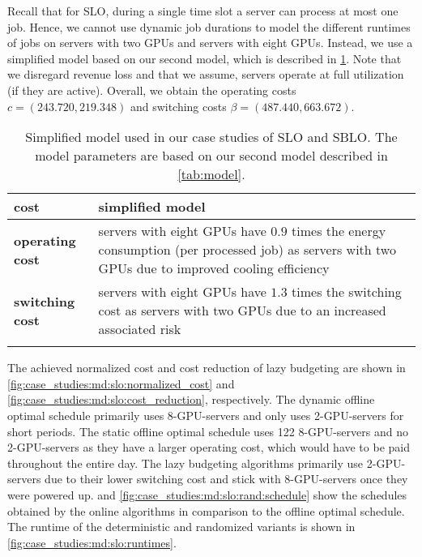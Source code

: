 Recall that for SLO, during a single time slot a server can process at most one job. Hence, we cannot use dynamic job durations to model the different runtimes of jobs on servers with two GPUs and servers with eight GPUs. Instead, we use a simplified model based on our second model, which is described in \cref{tab:simp_model}. Note that we disregard revenue loss and that we assume, servers operate at full utilization (if they are active). Overall, we obtain the operating costs $c = (243.720, 219.348)$ and switching costs $\beta = (487.440, 663.672)$.

\begin{table}
    \centering
    \begin{tabularx}{\textwidth}{>{\bfseries}l|X}
        cost & simplified model \\\hline
        operating cost & servers with eight GPUs have $0.9$ times the energy consumption (per processed job) as servers with two GPUs due to improved cooling efficiency \\
        switching cost & servers with eight GPUs have $1.3$ times the switching cost as servers with two GPUs due to an increased associated risk \\
    \caption{Simplified model used in our case studies of SLO and SBLO. The model parameters are based on our second model described in \cref{tab:model}.}
    \end{tabularx}
    \label{tab:simp_model}
\end{table}

The achieved normalized cost and cost reduction of lazy budgeting are shown in \cref{fig:case_studies:md:slo:normalized_cost} and \cref{fig:case_studies:md:slo:cost_reduction}, respectively. The dynamic offline optimal schedule primarily uses 8-GPU-servers and only uses 2-GPU-servers for short periods. The static offline optimal schedule uses 122 8-GPU-servers and no 2-GPU-servers as they have a larger operating cost, which would have to be paid throughout the entire day. The lazy budgeting algorithms primarily use 2-GPU-servers due to their lower switching cost and stick with 8-GPU-servers once they were powered up.  and \cref{fig:case_studies:md:slo:rand:schedule} show the schedules obtained by the online algorithms in comparison to the offline optimal schedule. The runtime of the deterministic and randomized variants is shown in \cref{fig:case_studies:md:slo:runtimes}.

